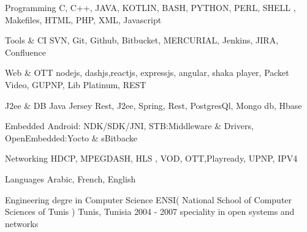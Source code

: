 \documentclass[11pt, a4paper]{awesome-cv} %
\begin{document}
\makecvheader %


\begin{cvskills}

    \cvskill
    {Programming} %
    {C, C++, JAVA, KOTLIN, BASH, PYTHON, PERL, SHELL , Makefiles, HTML, PHP, XML, Javascript  }%

    \cvskill
    {Tools \& CI} %
    {SVN, Git, Github, Bitbucket, MERCURIAL, Jenkins, JIRA, Confluence }%

    \cvskill
    {Web \& OTT} %
    {nodejs, dashjs,reactjs, expressjs, angular, shaka player, Packet Video, GUPNP, Lib Platinum, REST }%

    \cvskill
    {J2ee \& DB} %
    {Java Jersey Rest, J2ee, Spring, Rest, PostgresQl, Mongo db, Hbase} %

    \cvskill
    {Embedded} %
    { Android: NDK/SDK/JNI, STB:Middleware \& Drivers, OpenEmbedded:Yocto \& sBitbacke}
    
    \cvskill
    {Networking} %
    { HDCP, MPEGDASH, HLS , VOD, OTT,Playready, UPNP, IPV4}%

    \cvskill
    {Languages} %
    {Arabic, French, English} %

\end{cvskills}


\begin{cventries}

    \cventry
    {Engineering degre in Computer Science} %
    {ENSI( National School of Computer Sciences of Tunis )} %
    {Tunis, Tunisia} %
    {2004 - 2007} %
    { %
        speciality in open systems and networks
    }

\end{cventries}
\end{document}
